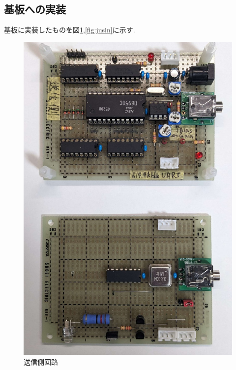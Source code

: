 \documentclass[a4paper,10pt]{article}
\begin{document}
\begin{multicols}{2}
\subsection{基板への実装}
基板に実装したものを図\ref{fig:sosin},\ref{fig:jusin}に示す.

\begin{figure}[H]
    \centering
    \includegraphics[width=0.8\linewidth]{figure/sosin.jpg} 
    \caption{送信側回路} 
    \label{fig:sosin}
\end{figure}


\end{multicols}
\end{document}
